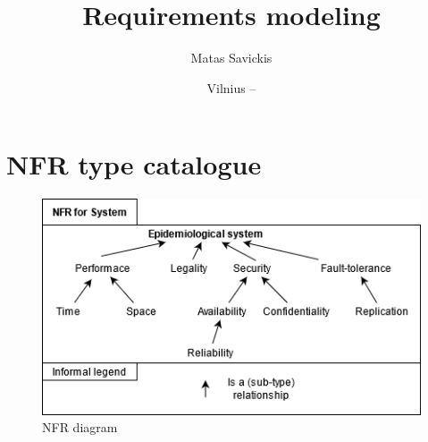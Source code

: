 \documentclass{VUMIFPSkursinis}
\title{Requirements modeling}
\author{Matas Savickis}
\date{Vilnius – \the\year}
\begin{document}
\maketitle

\tableofcontents

\section{NFR type catalogue}

\begin{figure}[htbp]
	\center
	\includegraphics[scale=0.9]{img/1}
	\caption{NFR diagram} %
	\label{img:kurimoProcesas}
\end{figure}
\end{document}
